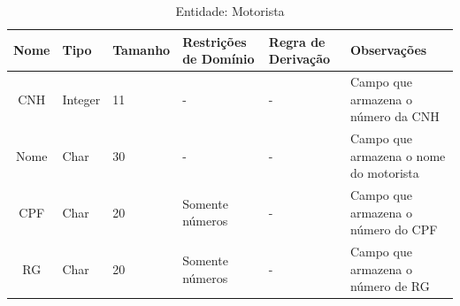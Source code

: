 \onecolumn

\begin{longtable}{  c  L{1.5cm}  C{1.2cm}  R{2.5cm}  p{2cm}  m{3.5cm}  }
\caption{Entidade: Motorista}\\
\toprule
Nome & Tipo & Tamanho  & Restrições de Domínio & Regra de Derivação & Observações \\ \midrule
{}
CNH & Integer & 11 & - & - & Campo que armazena o número da CNH \\
Nome & Char & 30 & - & - & Campo que armazena o nome do motorista \\
CPF & Char & 20 & Somente números & - & Campo que armazena o número do CPF \\
RG & Char & 20 & Somente números & - & Campo que armazena o número de RG \\ \bottomrule
\end{longtable}

\onecolumn


